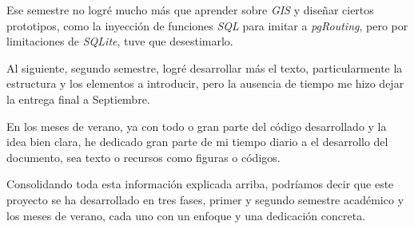 Ese semestre no logré mucho más que aprender sobre \textit{GIS} y diseñar ciertos prototipos, como la inyección de funciones \textit{SQL} para imitar a \textit{pgRouting}, pero por limitaciones de \textit{SQLite}, tuve que desestimarlo.

Al siguiente, segundo semestre, logré desarrollar más el texto, particularmente la estructura y los elementos a introducir, pero la ausencia de tiempo me hizo dejar la entrega final a Septiembre.

En los meses de verano, ya con todo o gran parte del código desarrollado y la idea bien clara, he dedicado gran parte de mi tiempo diario a el desarrollo del documento, sea texto o recursos como figuras o códigos.

Consolidando toda esta información explicada arriba, podríamos decir que este proyecto se ha desarrollado en tres fases, primer y segundo semestre académico y los meses de verano, cada uno con un enfoque y una dedicación concreta.